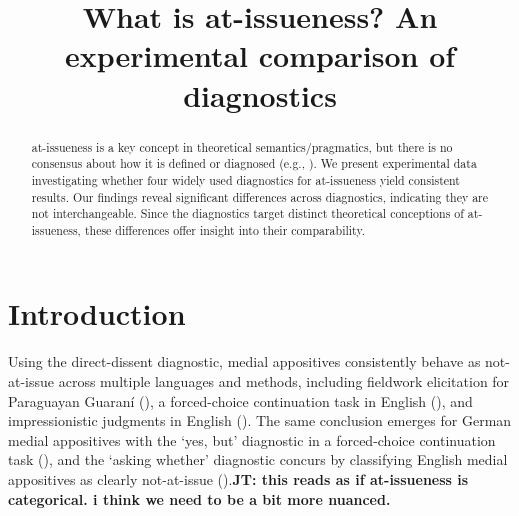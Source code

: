 \documentclass[times,linguex,xcolor]{glossa}
\title[What is at-issueness?]{What is at-issueness? An experimental comparison of diagnostics\\ 
  }
\author[]%
{%
}
\newcommand{\jt}[1]{\textbf{\color{orange}JT: #1}}
\begin{document}
\maketitle


\begin{abstract}
  at-issueness is a key concept in theoretical semantics/pragmatics, but there is no consensus about how it is defined or diagnosed (e.g., \citealt{tonhauser_diagnosing_2012,tonhauser_how_2018,koev_notions_2018}). We present experimental data investigating whether four widely used diagnostics for at-issueness yield consistent results. Our findings reveal significant differences across diagnostics, indicating they are not interchangeable. Since the diagnostics target distinct theoretical conceptions of at-issueness, these differences offer insight into their comparability.

\end{abstract}


\section{Introduction \label{sec:1_introduction}}


  

  

  


  Using the direct-dissent diagnostic, medial appositives consistently behave as not-at-issue across multiple languages and methods, including fieldwork elicitation for Paraguayan Guaraní (\citealt{tonhauser_diagnosing_2012}), a forced-choice continuation task in English (\citealt{syrett_experimental_2015}), and impressionistic judgments in English (\citealt{potts_logic_2005,amaral_review_2007}). The same conclusion emerges for German medial appositives with the `yes, but' diagnostic in a forced-choice continuation task (\citealt{destruel_cross-linguistic_2015}), and the `asking whether' diagnostic concurs by classifying English medial appositives as clearly not-at-issue (\citealt{tonhauser_how_2018,solstad_cataphoric_2024}).\jt{this reads as if at-issueness is categorical. i think we need to be a bit more nuanced.}
\end{document}
